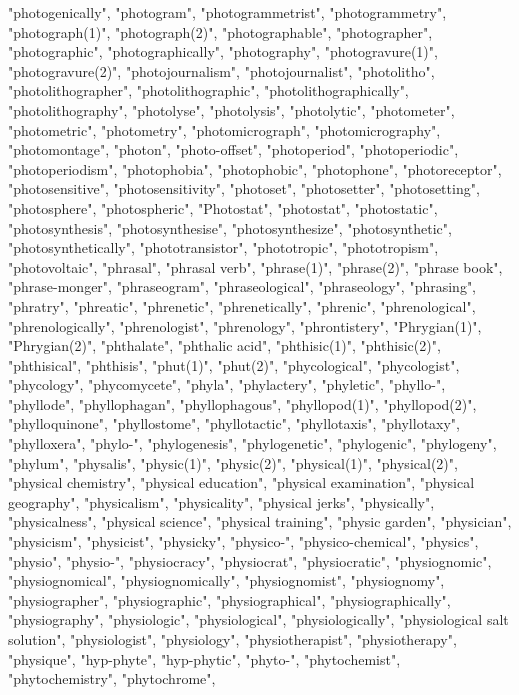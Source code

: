 "photogenically",
"photogram",
"photogrammetrist",
"photogrammetry",
"photograph(1)",
"photograph(2)",
"photographable",
"photographer",
"photographic",
"photographically",
"photography",
"photogravure(1)",
"photogravure(2)",
"photojournalism",
"photojournalist",
"photolitho",
"photolithographer",
"photolithographic",
"photolithographically",
"photolithography",
"photolyse",
"photolysis",
"photolytic",
"photometer",
"photometric",
"photometry",
"photomicrograph",
"photomicrography",
"photomontage",
"photon",
"photo-offset",
"photoperiod",
"photoperiodic",
"photoperiodism",
"photophobia",
"photophobic",
"photophone",
"photoreceptor",
"photosensitive",
"photosensitivity",
"photoset",
"photosetter",
"photosetting",
"photosphere",
"photospheric",
"Photostat",
"photostat",
"photostatic",
"photosynthesis",
"photosynthesise",
"photosynthesize",
"photosynthetic",
"photosynthetically",
"phototransistor",
"phototropic",
"phototropism",
"photovoltaic",
"phrasal",
"phrasal verb",
"phrase(1)",
"phrase(2)",
"phrase book",
"phrase-monger",
"phraseogram",
"phraseological",
"phraseology",
"phrasing",
"phratry",
"phreatic",
"phrenetic",
"phrenetically",
"phrenic",
"phrenological",
"phrenologically",
"phrenologist",
"phrenology",
"phrontistery",
"Phrygian(1)",
"Phrygian(2)",
"phthalate",
"phthalic acid",
"phthisic(1)",
"phthisic(2)",
"phthisical",
"phthisis",
"phut(1)",
"phut(2)",
"phycological",
"phycologist",
"phycology",
"phycomycete",
"phyla",
"phylactery",
"phyletic",
"phyllo-",
"phyllode",
"phyllophagan",
"phyllophagous",
"phyllopod(1)",
"phyllopod(2)",
"phylloquinone",
"phyllostome",
"phyllotactic",
"phyllotaxis",
"phyllotaxy",
"phylloxera",
"phylo-",
"phylogenesis",
"phylogenetic",
"phylogenic",
"phylogeny",
"phylum",
"physalis",
"physic(1)",
"physic(2)",
"physical(1)",
"physical(2)",
"physical chemistry",
"physical education",
"physical examination",
"physical geography",
"physicalism",
"physicality",
"physical jerks",
"physically",
"physicalness",
"physical science",
"physical training",
"physic garden",
"physician",
"physicism",
"physicist",
"physicky",
"physico-",
"physico-chemical",
"physics",
"physio",
"physio-",
"physiocracy",
"physiocrat",
"physiocratic",
"physiognomic",
"physiognomical",
"physiognomically",
"physiognomist",
"physiognomy",
"physiographer",
"physiographic",
"physiographical",
"physiographically",
"physiography",
"physiologic",
"physiological",
"physiologically",
"physiological salt solution",
"physiologist",
"physiology",
"physiotherapist",
"physiotherapy",
"physique",
"hyp-phyte",
"hyp-phytic",
"phyto-",
"phytochemist",
"phytochemistry",
"phytochrome",
